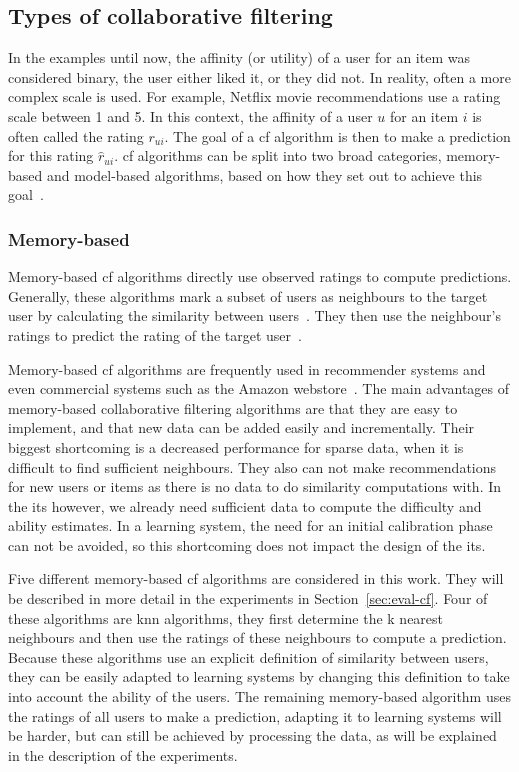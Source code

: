 \subsection{Types of collaborative filtering}
In the examples until now, the affinity (or utility) of a user for an item was considered binary, the user either liked it, or they did not.
In reality, often a more complex scale is used.
For example, Netflix movie recommendations use a rating scale between 1 and 5.
In this context, the affinity of a user $u$ for an item $i$ is often called the rating $r_{ui}$.
The goal of a \gls{cf} algorithm is then to make a prediction for this rating $\hat{r}_{ui}$.
\Gls{cf} algorithms can be split into two broad categories, memory-based and model-based algorithms, based on how they set out to achieve this goal~\cite{li2021novel,sharma2017collaborative,yu2004probabilistic,breese2013empirical,su2009survey}.

\subsubsection{Memory-based}
Memory-based \gls{cf} algorithms directly use observed ratings to compute predictions.
Generally, these algorithms mark a subset of users as neighbours to the target user by calculating the similarity between users~\cite{li2021novel,Hug2020}.
They then use the neighbour's ratings to predict the rating of the target user~\cite{su2009survey,Hug2020,Koren2010,Ricci2010}.

Memory-based \gls{cf} algorithms are frequently used in recommender systems and even commercial systems such as the Amazon webstore~\cite{sharma2017collaborative,yu2004probabilistic}.
The main advantages of memory-based collaborative filtering algorithms are that they are easy to implement, and that new data can be added easily and incrementally.
Their biggest shortcoming is a decreased performance for sparse data, when it is difficult to find sufficient neighbours.
They also can not make recommendations for new users or items as there is no data to do similarity computations with.
In the \gls{its} however, we already need sufficient data to compute the difficulty and ability estimates.
In a learning system, the need for an initial calibration phase can not be avoided, so this shortcoming does not impact the design of the \gls{its}.

Five different memory-based \gls{cf} algorithms are considered in this work. 
They will be described in more detail in the experiments in Section~\ref{sec:eval-cf}.
Four of these algorithms are \gls{knn} algorithms, they first determine the k nearest neighbours and then use the ratings of these neighbours to compute a prediction.
Because these algorithms use an explicit definition of similarity between users, they can be easily adapted to learning systems by changing this definition to take into account the ability of the users.
The remaining memory-based algorithm uses the ratings of all users to make a prediction, adapting it to learning systems will be harder, but can still be achieved by processing the data, as will be explained in the description of the experiments.

